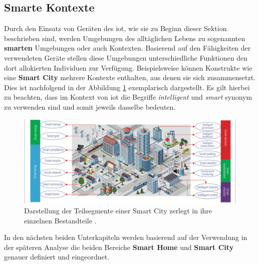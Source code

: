 \subsection{Smarte Kontexte}
\label{sec:Grundlagen:ssec:Smarte Kontexte}

Durch den Einsatz von Geräten des \ac{iot}, wie sie zu Beginn dieser Sektion beschrieben sind, werden Umgebungen des alltäglichen Lebens zu sogenannten \textbf{smarten} Umgebungen oder auch Kontexten. Basierend auf den Fähigkeiten der verwendeten Geräte stellen diese Umgebungen unterschiedliche Funktionen den dort allokierten Individuen zur Verfügung. Beispielsweise können Konstrukte wie eine \textbf{Smart City} mehrere Kontexte enthalten, aus denen sie sich zusammensetzt. Dies ist nachfolgend in der Abbildung \ref{fig:smart-applications} exemplarisch dargestellt. Es gilt hierbei zu beachten, dass im Kontext von \ac{iot} die Begriffe \textit{intelligent} und \textit{smart} synonym zu verwenden sind und somit jeweils dasselbe bedeuten.

\begin{figure}
    \includegraphics[width=\textwidth]{fundamentals/pictures/Smart_Applications}
    \caption{Darstellung der Teilsegmente einer Smart City zerlegt in ihre einzelnen Bestandteile \cite{Zhang2017}.}
    \label{fig:smart-applications}
\end{figure}

\noindent In den nächsten beiden Unterkapiteln werden basierend auf der Verwendung in der späteren Analyse die beiden Bereiche \textbf{Smart Home} und \textbf{Smart City} genauer definiert und eingeordnet.


